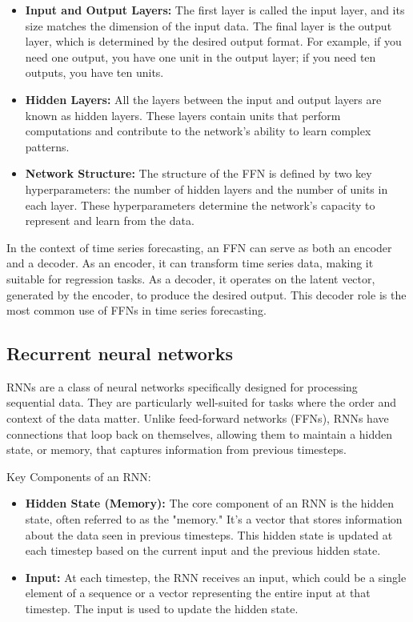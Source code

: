 \documentclass{article}
\begin{document}
\begin{itemize}
    \item \textbf{Input and Output Layers:} The first layer is called the input layer, and its size matches the dimension of the input data. The final layer is the output layer, which is determined by the desired output format. For example, if you need one output, you have one unit in the output layer; if you need ten outputs, you have ten units.
    \item \textbf{Hidden Layers:} All the layers between the input and output layers are known as hidden layers. These layers contain units that perform computations and contribute to the network's ability to learn complex patterns.
    \item \textbf{Network Structure:} The structure of the FFN is defined by two key hyperparameters: the number of hidden layers and the number of units in each layer. These hyperparameters determine the network's capacity to represent and learn from the data.
\end{itemize}

In the context of time series forecasting, an FFN can serve as both an encoder and a decoder. 
As an encoder, it can transform time series data, making it suitable for regression tasks. 
As a decoder, it operates on the latent vector, generated by the encoder, to produce the desired output. 
This decoder role is the most common use of FFNs in time series forecasting.

\subsection{Recurrent neural networks}
RNNs are a class of neural networks specifically designed for processing sequential data. 
They are particularly well-suited for tasks where the order and context of the data matter. 
Unlike feed-forward networks (FFNs), RNNs have connections that loop back on themselves, allowing them to maintain a hidden state, or memory, that captures information from previous timesteps.

Key Components of an RNN:
\begin{itemize}
    \item \textbf{Hidden State (Memory):} The core component of an RNN is the hidden state, often referred to as the "memory." It's a vector that stores information about the data seen in previous timesteps. This hidden state is updated at each timestep based on the current input and the previous hidden state.
    \item \textbf{Input:} At each timestep, the RNN receives an input, which could be a single element of a sequence or a vector representing the entire input at that timestep. The input is used to update the hidden state.
\end{itemize}
\end{document}
